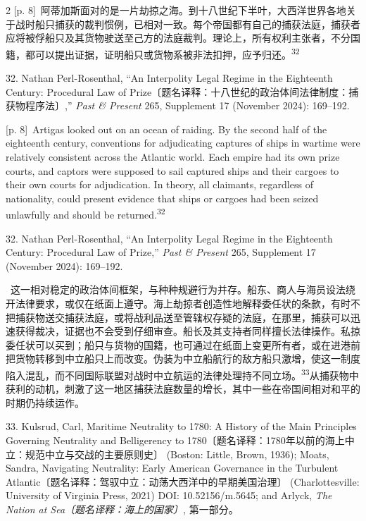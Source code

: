 \documentclass[10pt,a4paper]{article}
\begin{document}
\begin{paracol}{2}
{\scriptsize\color{gray} [p. 8]}\ 阿蒂加斯面对的是一片劫掠之海。到十八世纪下半叶，大西洋世界各地关于战时船只捕获的裁判惯例，已相对一致。每个帝国都有自己的捕获法庭，捕获者应将被俘船只及其货物驶送至己方的法庭裁判。理论上，所有权利主张者，不分国籍，都可以提出证据，证明船只或货物系被非法扣押，应予归\mbox{还。\textsuperscript{32}}\par{\small 32. Nathan Perl-Rosenthal, “An Interpolity Legal Regime in the Eighteenth Century: Procedural Law of Prize〔题名译释：十八世纪的政治体间法律制度：捕获物程序法〕,” \textit{Past \& Present} 265, Supplement 17 (November 2024): 169–192.\par}
\switchcolumn
{\scriptsize\color{gray} [p. 8]}\ Artigas looked out on an ocean of raiding. By the second half of the eighteenth century, conventions for adjudicating captures of ships in wartime were relatively consistent across the Atlantic world. Each empire had its own prize courts, and captors were supposed to sail captured ships and their cargoes to their own courts for adjudication. In theory, all claimants, regardless of nationality, could present evidence that ships or cargoes had been seized unlawfully and should be returned.\nobreak\textsuperscript{32}\par{\small 32. Nathan Perl-Rosenthal, “An Interpolity Legal Regime in the Eighteenth Century: Procedural Law of Prize,” \textit{Past \& Present} 265, Supplement 17 (November 2024): 169–192.\par}
\switchcolumn*
{\scriptsize\color{gray} [p. 8]}\ 这一相对稳定的政治体间框架，与种种规避行为并存。船东、商人与海员设法绕开法律要求，或仅在纸面上遵守。海上劫掠者创造性地解释委任状的条款，有时不把捕获物送交捕获法庭，或将战利品送至管辖权存疑的法庭，在那里，捕获可以迅速获得裁决，证据也不会受到仔细审查。船长及其支持者同样擅长法律操作。私掠委任状可以买到；船只与货物的国籍，也可通过在纸面上变更所有者，或在进港前把货物转移到中立船只上而改变。伪装为中立船航行的敌方船只激增，使这一制度陷入混乱，而不同国际联盟对战时中立航运的法律处理持不同立\mbox{场。\textsuperscript{33}}从捕获物中获利的动机，刺激了这一地区捕获法庭数量的增长，其中一些在帝国间相对和平的时期仍持续运作。\par{\small 33. Kulsrud, Carl, Maritime Neutrality to 1780: A History of the Main Principles Governing Neutrality and Belligerency to 1780〔题名译释：1780年以前的海上中立：规范中立与交战的主要原则史〕 (Boston: Little, Brown, 1936); Moats, Sandra, Navigating Neutrality: Early American Governance in the Turbulent Atlantic〔题名译释：驾驭中立：动荡大西洋中的早期美国治理〕 (Charlottesville: University of Virginia Press, 2021) DOI: 10.52156/m.5645; and Arlyck, \textit{The Nation at Sea〔题名译释：海上的国家〕}, 第一部分。\par}

\end{paracol}
\end{document}
